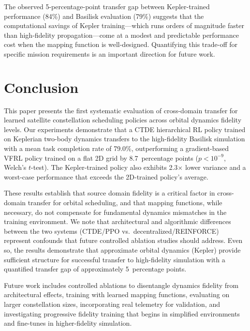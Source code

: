 \documentclass[conference]{IEEEtran}
\begin{document}
The observed 5-percentage-point transfer gap between Kepler-trained performance (84\%) and Basilisk evaluation (79\%) suggests that the computational savings of Kepler training---which runs orders of magnitude faster than high-fidelity propagation---come at a modest and predictable performance cost when the mapping function is well-designed. Quantifying this trade-off for specific mission requirements is an important direction for future work.


\section{Conclusion}
\label{sec:conclusion}

This paper presents the first systematic evaluation of cross-domain transfer for learned satellite constellation scheduling policies across orbital dynamics fidelity levels. Our experiments demonstrate that a CTDE hierarchical RL policy trained on Keplerian two-body dynamics transfers to the high-fidelity Basilisk simulation with a mean task completion rate of 79.0\%, outperforming a gradient-based VFRL policy trained on a flat 2D grid by 8.7~percentage points ($p < 10^{-9}$, Welch's $t$-test). The Kepler-trained policy also exhibits 2.3$\times$ lower variance and a worst-case performance that exceeds the 2D-trained policy's average.

These results establish that source domain fidelity is a critical factor in cross-domain transfer for orbital scheduling, and that mapping functions, while necessary, do not compensate for fundamental dynamics mismatches in the training environment. We note that architectural and algorithmic differences between the two systems (CTDE/PPO vs.\ decentralized/REINFORCE) represent confounds that future controlled ablation studies should address. Even so, the results demonstrate that approximate orbital dynamics (Kepler) provide sufficient structure for successful transfer to high-fidelity simulation with a quantified transfer gap of approximately 5~percentage points.

Future work includes controlled ablations to disentangle dynamics fidelity from architectural effects, training with learned mapping functions, evaluating on larger constellation sizes, incorporating real telemetry for validation, and investigating progressive fidelity training that begins in simplified environments and fine-tunes in higher-fidelity simulation.
\end{document}
